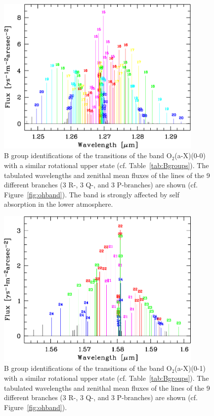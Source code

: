 \begin{figure}
\centering
\includegraphics[width=10cm,clip=true]
{figures/scd_ploto2a00band.pdf}
\caption[]{B group identifications of the transitions of the band
O$_2$(a-X)(0-0) with a similar rotational upper state (cf.
Table~\ref{tab:Bgroups}). The tabulated wavelengths and zenithal mean fluxes of
the lines of the 9 different branches (3 R-, 3 Q-, and 3 P-branches) are shown
(cf. Figure~\ref{fig:ohband}). The band is strongly affected by self
absorption in the lower atmosphere.}
\label{fig:o2a00band}
\end{figure}

\begin{figure}
\centering
\includegraphics[width=10cm,clip=true]
{figures/scd_ploto2a01band.pdf}
\caption[]{B group identifications of the transitions of the band
O$_2$(a-X)(0-1) with a similar rotational upper state (cf.
Table~\ref{tab:Bgroups}). The tabulated wavelengths and zenithal mean fluxes of
the lines of the 9 different branches (3 R-, 3 Q-, and 3 P-branches) are shown
(cf. Figure~\ref{fig:ohband}).}
\label{fig:o2a01band}
\end{figure}

